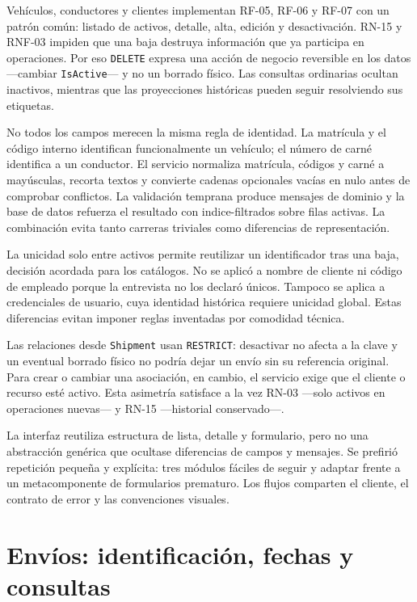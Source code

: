 Vehículos, conductores y clientes implementan RF-05, RF-06 y RF-07 con un patrón común: listado de activos, detalle, alta, edición y desactivación. RN-15 y RNF-03 impiden que una baja destruya información que ya participa en operaciones. Por eso \texttt{DELETE} expresa una acción de negocio reversible en los datos ---cambiar \texttt{IsActive}--- y no un borrado físico. Las consultas ordinarias ocultan inactivos, mientras que las proyecciones históricas pueden seguir resolviendo sus etiquetas.

No todos los campos merecen la misma regla de identidad. La matrícula y el código interno identifican funcionalmente un vehículo; el número de carné identifica a un conductor. El servicio normaliza matrícula, códigos y carné a mayúsculas, recorta textos y convierte cadenas opcionales vacías en nulo antes de comprobar conflictos. La validación temprana produce mensajes de dominio y la base de datos refuerza el resultado con \glspl{indice-filtrado} sobre filas activas. La combinación evita tanto carreras triviales como diferencias de representación.

La unicidad solo entre activos permite reutilizar un identificador tras una baja, decisión acordada para los catálogos. No se aplicó a nombre de cliente ni código de empleado porque la entrevista no los declaró únicos. Tampoco se aplica a credenciales de usuario, cuya identidad histórica requiere unicidad global. Estas diferencias evitan imponer reglas inventadas por comodidad técnica.

Las relaciones desde \texttt{Shipment} usan \texttt{RESTRICT}: desactivar no afecta a la clave y un eventual borrado físico no podría dejar un envío sin su referencia original. Para crear o cambiar una asociación, en cambio, el servicio exige que el cliente o recurso esté activo. Esta asimetría satisface a la vez RN-03 ---solo activos en operaciones nuevas--- y RN-15 ---historial conservado---.

La interfaz reutiliza estructura de lista, detalle y formulario, pero no una abstracción genérica que ocultase diferencias de campos y mensajes. Se prefirió repetición pequeña y explícita: tres módulos fáciles de seguir y adaptar frente a un metacomponente de formularios prematuro. Los flujos comparten el cliente, el contrato de error y las convenciones visuales.

\section{Envíos: identificación, fechas y consultas}

